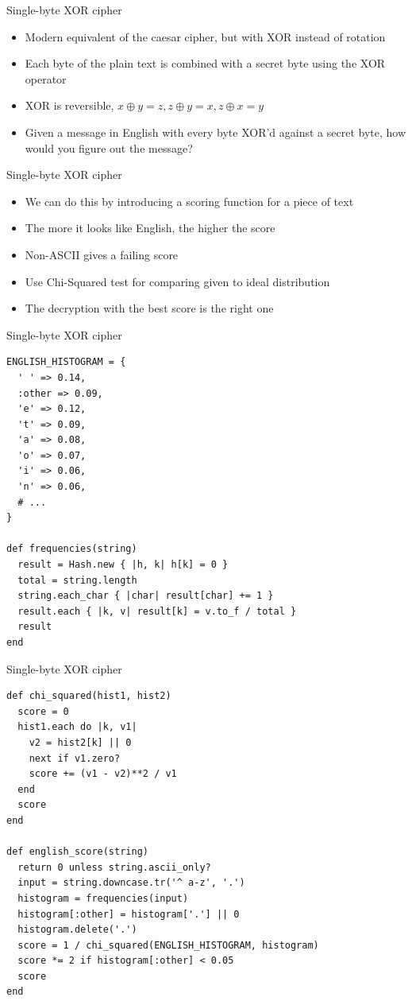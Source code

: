 \documentclass[presentation]{beamer}
\begin{document}
\begin{frame}[label={sec:org07fdfce}]{Single-byte XOR cipher}
\begin{itemize}
\item Modern equivalent of the caesar cipher, but with XOR instead of
rotation
\item Each byte of the plain text is combined with a secret byte using the
XOR operator
\item XOR is reversible, \(x \oplus y = z, z \oplus y = x, z \oplus x = y\)
\item Given a message in English with every byte XOR'd against a secret
byte, how would you figure out the message?
\end{itemize}
\end{frame}

\begin{frame}[label={sec:org32f5b72}]{Single-byte XOR cipher}
\begin{itemize}
\item We can do this by introducing a scoring function for a piece of text
\item The more it looks like English, the higher the score
\item Non-ASCII gives a failing score
\item Use Chi-Squared test for comparing given to ideal distribution
\item The decryption with the best score is the right one
\end{itemize}
\end{frame}

\begin{frame}[fragile,label={sec:org64006de}]{Single-byte XOR cipher}
 \begin{verbatim}
ENGLISH_HISTOGRAM = {
  ' ' => 0.14,
  :other => 0.09,
  'e' => 0.12,
  't' => 0.09,
  'a' => 0.08,
  'o' => 0.07,
  'i' => 0.06,
  'n' => 0.06,
  # ...
}

def frequencies(string)
  result = Hash.new { |h, k| h[k] = 0 }
  total = string.length
  string.each_char { |char| result[char] += 1 }
  result.each { |k, v| result[k] = v.to_f / total }
  result
end
\end{verbatim}
\end{frame}

\begin{frame}[fragile,label={sec:org31d09ba}]{Single-byte XOR cipher}
 \begin{verbatim}
def chi_squared(hist1, hist2)
  score = 0
  hist1.each do |k, v1|
    v2 = hist2[k] || 0
    next if v1.zero?
    score += (v1 - v2)**2 / v1
  end
  score
end

def english_score(string)
  return 0 unless string.ascii_only?
  input = string.downcase.tr('^ a-z', '.')
  histogram = frequencies(input)
  histogram[:other] = histogram['.'] || 0
  histogram.delete('.')
  score = 1 / chi_squared(ENGLISH_HISTOGRAM, histogram)
  score *= 2 if histogram[:other] < 0.05
  score
end
\end{verbatim}
\end{frame}
\end{document}
